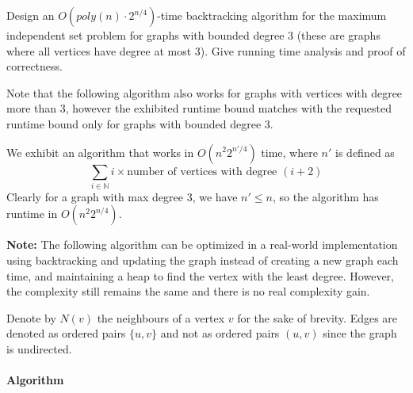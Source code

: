 \documentclass[answers]{exam}
\begin{document}
\begin{questions}
\vspace{0.3in}




\question[20] Design an $O(poly(n) \cdot 2^{n/4})$-time backtracking algorithm for the maximum independent set problem for graphs with bounded degree $3$ (these are graphs where all vertices have degree at most $3$). Give running time analysis and proof of correctness.

\begin{solution}

    Note that the following algorithm also works for graphs with vertices with degree more than $3$, however the exhibited runtime bound matches with the requested runtime bound only for graphs with bounded degree $3$.

    We exhibit an algorithm that works in $O(n^2 2^{n'/4})$ time, where $n'$ is defined as $$\sum_{i \in \mathbb{N}} i \times\text{number of vertices with degree }(i + 2)$$
    Clearly for a graph with max degree $3$, we have $n' \le n$, so the algorithm has runtime in $O(n^2 2^{n/4})$. 

    \textbf{Note:} The following algorithm can be optimized in a real-world implementation using backtracking and updating the graph instead of creating a new graph each time, and maintaining a heap
    to find the vertex with the least degree. However, the complexity still remains the same and there is no real complexity gain.

    Denote by $N(v)$ the neighbours of a vertex $v$ for the sake of brevity. Edges are denoted as ordered pairs $\{u, v\}$ and not as ordered pairs $(u, v)$ since the graph is undirected.

\paragraph{Algorithm}


\end{solution}
\end{questions}
\end{document}

